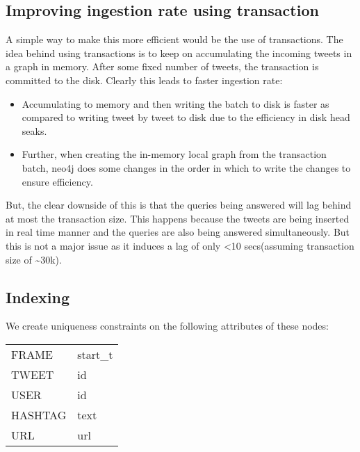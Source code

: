 \documentclass[letterpaper,10pt,english]{sphinxmanual}
\begin{document}
\subsection{Improving ingestion rate using transaction}
\label{\detokenize{neo4j_data_ingestion:improving-ingestion-rate-using-transaction}}
A simple way to make this more efficient would be the use of transactions. The idea behind using transactions is to keep on accumulating the incoming tweets in a graph in memory. After some fixed number of tweets, the transaction is committed to the disk. Clearly this leads to faster ingestion rate:
\begin{itemize}
\item {} 
Accumulating to memory and then writing the batch to disk is faster as compared to writing tweet by tweet to disk due to the efficiency in disk head seaks.

\item {} 
Further, when creating the in-memory local graph from the transaction batch, neo4j does some changes in the order in which to write the changes to ensure efficiency.

\end{itemize}

But, the clear downside of this is that the queries being answered will lag behind at most the transaction size. This happens because the tweets are being inserted in real time manner and the queries are also being answered simultaneously. But this is not a major issue as it induces a lag of only \textless{}10 secs(assuming transaction size of \textasciitilde{}30k).


\subsection{Indexing}
\label{\detokenize{neo4j_data_ingestion:indexing}}
We create uniqueness constraints on the following attributes of these nodes:


\begin{savenotes}\sphinxattablestart
\centering
\begin{tabulary}{\linewidth}[t]{|T|T|}
\hline
{}\relax &\relax \\
\hline
FRAME
&
start\_t
\\
\hline
TWEET
&
id
\\
\hline
USER
&
id
\\
\hline
HASHTAG
&
text
\\
\hline
URL
&
url
\\
\hline
\end{tabulary}
\par
\sphinxattableend\end{savenotes}
\end{document}
